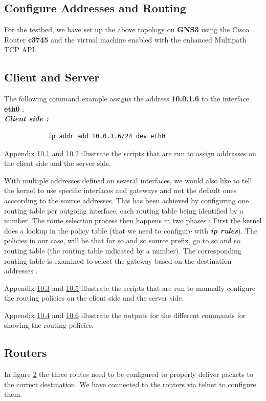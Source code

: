 \documentclass[a4paper,11pt]{article}
\begin{document}
		\subsection{Configure Addresses and Routing}
			\label{subsec:addressandroute}
			For the testbed, we have set up the above topology on \textbf{GNS3} using the Cisco Router \textbf{c3745} and the virtual machine enabled with the enhanced Multipath TCP API.

			\subsection{Client and Server}
			\label{subsec:clientandserver}
			The following command example assigns the address \textbf{10.0.1.6} to the interface \textbf{eth0} : \\
			\textbf{\emph{Client side :}} \\
			\begin{lstlisting}
			ip addr add 10.0.1.6/24 dev eth0
			\end{lstlisting}
			Appendix \hyperref[subsec:clientaddress]{10.1} and \hyperref[subsec:serveraddress]{10.2} illustrate the scripts that are run to assign addresses on the client side and the server side.

			With multiple addresses defined on several interfaces, we would also like to tell the kernel to use specific interfaces and gateways and not the default ones acccording to the source addresses. This has been achieved by configuring one routing table per outgoing interface, each routing table being identified by a number. The route selection process then happens in two phases : First the kernel does a lookup in the policy table (that we need to configure with \textbf{\emph{ip rules}}). The policies in our case, will be that for so and so source prefix, go to so and so routing table (the routing table indicated by a number). The corresponding routing table is examined to select the gateway based on the destination addresses \cite{routing}.

			Appendix \hyperref[subsec:clientroute]{10.3} and \hyperref[subsec:serverroute]{10.5} illustrate the scripts that are run to manually configure the routing policies on the client side and the server side.

			Appendix \hyperref[subsec:clientrouteout]{10.4} and \hyperref[subsec:serverrouteout]{10.6} illustrate the outputs for the different commands for showing the routing policies.

			\subsection{Routers}
			\label{subsec:router}
			In figure \hyperref[fig:topology]{2} the three routes need to be configured to properly deliver packets to the correct destination.
			We have connected to the routers via telnet to configure them.
\end{document}
